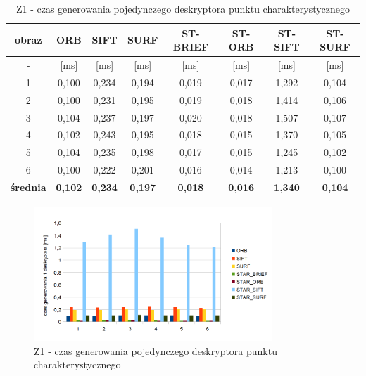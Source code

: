 \begin{table}[htbp]
  \centering
  \caption{Z1 - czas generowania pojedynczego deskryptora punktu charakterystycznego}
    \begin{tabular}{|c|c|c|c|c|c|c|c|}\hline

    obraz & \textbf{ORB} & \textbf{SIFT} & \textbf{SURF} & \textbf{ST-BRIEF} & \textbf{ST-ORB} & \textbf{ST-SIFT} & \textbf{ST-SURF} \\\hline

    - & [ms] & [ms] & [ms] & [ms] & [ms] & [ms] & [ms] \\\hline
    1 & 0,100 & 0,234 & 0,194 & 0,019 & 0,017 & 1,292 & 0,104 \\
    2 & 0,100 & 0,231 & 0,195 & 0,019 & 0,018 & 1,414 & 0,106 \\
    3 & 0,104 & 0,237 & 0,197 & 0,020 & 0,018 & 1,507 & 0,107 \\
    4 & 0,102 & 0,243 & 0,195 & 0,018 & 0,015 & 1,370 & 0,105 \\
    5 & 0,104 & 0,235 & 0,198 & 0,017 & 0,015 & 1,245 & 0,102 \\
    6 & 0,100 & 0,222 & 0,201 & 0,016 & 0,014 & 1,213 & 0,100 \\\hline
    \textbf{średnia} & \textbf{0,102} & \textbf{0,234} & \textbf{0,197} & \textbf{0,018} & \textbf{0,016} & \textbf{1,340} & \textbf{0,104} \\\hline
    
   
   

    \end{tabular}%
  \label{tab:z1_f3}%
\end{table}%


\begin{figure}
\centering
\includegraphics[width=0.8\textwidth]{pict/slowik/z1/f3.png}
\caption{Z1 - czas generowania pojedynczego deskryptora punktu charakterystycznego}
\label{fig:z1_f3}
\end{figure}


